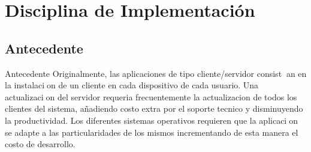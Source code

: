 
\chapter{Disciplina de Implementación}
\label{chap:implementacion}

    \section{Antecedente}
        Antecedente
        Originalmente, las aplicaciones de tipo cliente/servidor consistan en la instalacion de un cliente en cada dispositivo de cada usuario. Una actualizacion del servidor requeria frecuentemente la actualizacion de todos los clientes del sistema, añadiendo costo extra por el soporte tecnico y disminuyendo la productividad. Los diferentes sistemas operativos requieren que la aplicacion se adapte a las particularidades de los mismos incrementando de esta manera el costo de desarrollo.
